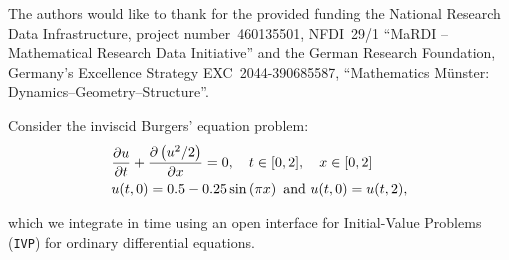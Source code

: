 \documentclass[a0paper, twocolumn, csc, english, final]{mpi2015_poster}
\begin{document}
\begin{poster}
\begin{pcolumn}
\begin{pbox}

    \end{pbox}

    \begin{pbox}
      \large
      The authors would like to thank for the provided funding
      the National Research Data Infrastructure,
      project number~460135501, NFDI~29/1 “MaRDI – Mathematical
      Research Data Initiative”
      and
      the German Research Foundation,
      Germany's Excellence Strategy EXC~2044-390685587,
      ``Mathematics Münster: Dynamics--Geometry--Structure''.
    \end{pbox}
  \end{pcolumn}
  \begin{pcolumn}
    \begin{pbox}
      \large
      Consider the inviscid Burgers' equation problem:
      \begin{align*}
         & \pdv{u}{t} + \pdv{\left( u^{2} / 2 \right)}{x} = 0,
        \quad t \in [0, 2], \quad x \in [0, 2]                         \\
         & u(t, 0) = 0.5 - 0.25 \sin \left( \pi x \right) \mbox{ and }
        u(t, 0) = u(t, 2),
      \end{align*}
      \begin{minipage}{\dimexpr0.58\columnwidth - 2\tabcolsep}
        which we integrate in time
        using an open interface
        for Initial-Value Problems (\texttt{IVP}) for ordinary
        differential equations.


\end{minipage}
\end{pbox}
\end{pcolumn}
\end{poster}
\end{document}
